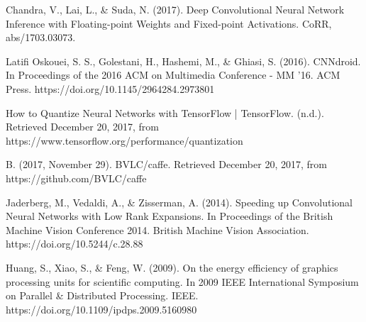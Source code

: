 \begin{thebibliography}{4}
{Chandra, V., Lai, L., \& Suda, N. (2017). Deep Convolutional Neural Network Inference with Floating-point Weights and Fixed-point Activations. CoRR, abs/1703.03073.}

{Latifi Oskouei, S. S., Golestani, H., Hashemi, M., \& Ghiasi, S. (2016). CNNdroid. In Proceedings of the 2016 ACM on Multimedia Conference - MM ’16. ACM Press. https://doi.org/10.1145/2964284.2973801}

{How to Quantize Neural Networks with TensorFlow  |  TensorFlow. (n.d.). Retrieved December 20, 2017, from https://www.tensorflow.org/performance/quantization}

{B. (2017, November 29). BVLC/caffe. Retrieved December 20, 2017, from https://github.com/BVLC/caffe}

{Jaderberg, M., Vedaldi, A., \& Zisserman, A. (2014). Speeding up Convolutional Neural Networks with Low Rank Expansions. In Proceedings of the British Machine Vision Conference 2014. British Machine Vision Association. https://doi.org/10.5244/c.28.88}

{Huang, S., Xiao, S., \& Feng, W. (2009). On the energy efficiency of graphics processing units for scientific computing. In 2009 IEEE International Symposium on Parallel \& Distributed Processing. IEEE. https://doi.org/10.1109/ipdps.2009.5160980}

\end{thebibliography}

